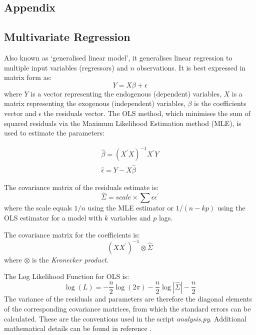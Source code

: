 \documentclass[11pt]{article}
\begin{document}
\begin{appendices}    
    
    \chapter{{\huge \bf Appendix}} \label{appendixA}
    
    \section{Multivariate Regression}\label{multivariate-regression}
    
Also known as `generalised linear model', it generalises linear
regression to multiple input variables (regressors) and \(n\)
observations. It is best expressed in matrix form as:
\begin{equation}
Y = X \beta + \epsilon
\end{equation}
where \(Y\) is a vector representing the endogenous (dependent)
variables, \(X\) is a matrix representing the exogenous (independent)
variables, \(\beta\) is the coefficients vector and \(\epsilon\) the
residuals vector.
The OLS method, which minimises the sum of squared residuals via the
Maximum Likelihood Estimation method (MLE), is used to estimate the
parameters:

\begin{align}
\hat{\beta} = (X^\prime X)^{-1} X^\prime Y \\
\hat{\epsilon} = Y - X \hat{\beta}
\end{align}

The covariance matrix of the residuals estimate is:
\begin{equation}
\hat{\Sigma} = scale \times  \sum \epsilon \epsilon^\prime
\end{equation} where the scale equals  \(1/ n\) using the MLE estimator or
\(1/ (n - kp)\) using the OLS estimator for a model with \(k\)
variables and \(p\) lags.


The covariance matrix for the coefficients is:
\begin{equation}
(X X^\prime)^{-1} \otimes \hat{\Sigma}
\end{equation} where \(\otimes\) is the \emph{Kronecker product}.


The Log Likelihood Function for OLS is:
\begin{equation}
\log(L) = -\frac{n}{2}\log (2 \pi) -\frac{n}{2}\log | \hat{\Sigma}| - \frac{n}{2}
\end{equation}
The variance of the residuals and parameters are therefore the diagonal
elements of the corresponding covariance matrices, from which the
standard errors can be calculated.
These are the conventions used in the script \emph{analysis.py}.
Additional mathematical details can be found in reference \cite{wikiVAR}.



\end{appendices}
\end{document}
